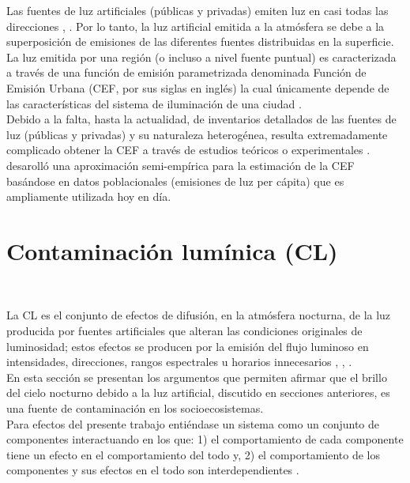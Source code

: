 Las fuentes de luz artificiales (públicas y privadas) emiten luz en casi todas las direcciones \citep{Kocifaj2014}, \citep{Kocifaj2016}. Por lo tanto, la luz artificial emitida a la atmósfera se debe a la superposición de emisiones de las diferentes fuentes distribuidas en la superficie.\\

La luz emitida por una región (o incluso a nivel fuente puntual) es caracterizada a través de una función de emisión parametrizada denominada Función de Emisión Urbana (CEF, por sus siglas en inglés) la cual únicamente depende de las características del sistema de iluminación de una ciudad \citep{Kocifaj2014}.\\

Debido a la falta, hasta la actualidad, de inventarios detallados de las fuentes de luz (públicas y privadas) y su naturaleza heterogénea, resulta extremadamente complicado obtener la CEF a través de estudios teóricos o experimentales \citep{Kocifaj2014}. \cite{Garstang1986} desarolló una aproximación semi-empírica para la estimación de la CEF basándose en datos poblacionales (emisiones de luz per cápita) que es ampliamente utilizada hoy en día.

\newpage

\section{Contaminación lumínica (CL)}\\
\label{sec:contaminacionluminica}

La CL es el conjunto de efectos de difusión, en la atmósfera nocturna, de la luz producida por fuentes artificiales que alteran las condiciones originales de luminosidad; estos efectos se producen por la emisión del flujo luminoso en intensidades, direcciones, rangos espectrales u horarios innecesarios \citep{AtlasREPSA}, \citep{LibroCL}, \citep{Stone2017}.\\

En esta sección se presentan los argumentos que permiten afirmar que el brillo del cielo nocturno debido a la luz artificial, discutido en secciones anteriores, es una fuente de contaminación en los socioecosistemas.\\

Para efectos del presente trabajo entiéndase un sistema como un conjunto de componentes interactuando en los que: 1) el comportamiento de cada componente tiene un efecto en el comportamiento del todo y, 2) el comportamiento de los componentes y sus efectos en el todo son interdependientes \citep{Avila2019}.\\

